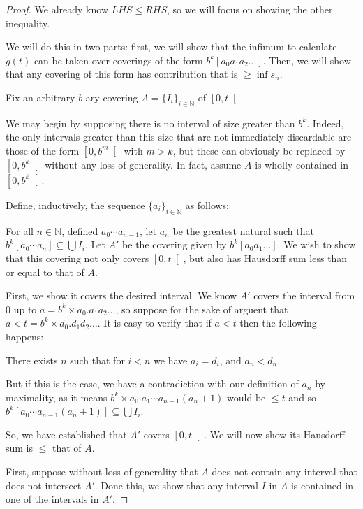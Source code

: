 \documentclass[11pt, reqno]{amsart}
\newcommand{\N}{\mathbb{N}}
\begin{document}
\begin{proof}
We already know $LHS \leq RHS$, so we will focus on showing the other inequality.

We will do this in two parts: first, we will show that the infimum to calculate $g(t)$ can be taken over coverings of the form $b^k [a_0 a_1 a_2 \dots]$. Then, we will show that any covering of this form has contribution that is $\geq \inf s_n$.

Fix an arbitrary $b$-ary covering $A = \{ I_i \}_{i \in \N}$ of $\left[ 0, t \right[$.

We may begin by supposing there is no interval of size greater than $b^k$. Indeed, the only intervals greater than this size that are not immediately discardable are those of the form $\left[0, b^m \right[$ with $m > k$, but these can obviously be replaced by $\left[0, b^k \right[$ without any loss of generality. In fact, assume $A$ is wholly contained in $\left[0, b^k \right[$.

Define, inductively, the sequence $\{a_i\}_{i \in \N}$ as follows:

For all $n \in \N$, defined $a_0 \cdots a_{n-1}$, let $a_n$ be the greatest natural such that $b^k [a_0 \cdots a_n] \subseteq \bigcup I_i$. Let $A'$ be the covering given by $b^k [a_0 a_1 \dots]$. We wish to show that this covering not only covers $\left[0, t \right[$, but also has Hausdorff sum less than or equal to that of $A$.

First, we show it covers the desired interval. We know $A'$ covers the interval from 0 up to $a = b^k \times a_0 . a_1 a_2 \dots$, so suppose for the sake of arguent that $a < t = b^k \times d_0 . d_1 d_2 \dots$. It is easy to verify that if $a < t$ then the following happens:

There exists $n$ such that for $i < n$ we have $a_i = d_i$, and $a_n < d_n$.

But if this is the case, we have a contradiction with our definition of $a_n$ by maximality, as it means $b^k \times a_0 . a_1 \cdots a_{n-1} (a_n + 1)$ would be $\leq t$ and so $b^k [a_0 \cdots a_{n-1} (a_n + 1)] \subseteq \bigcup I_i$.

So, we have established that $A'$ covers $\left[0, t\right[$. We will now show its Hausdorff sum is $\leq$ that of $A$.

First, suppose without loss of generality that $A$ does not contain any interval that does not intersect $A'$. Done this, we show that any interval $I$ in $A$ is contained in one of the intervals in $A'$.


\end{proof}
\end{document}
